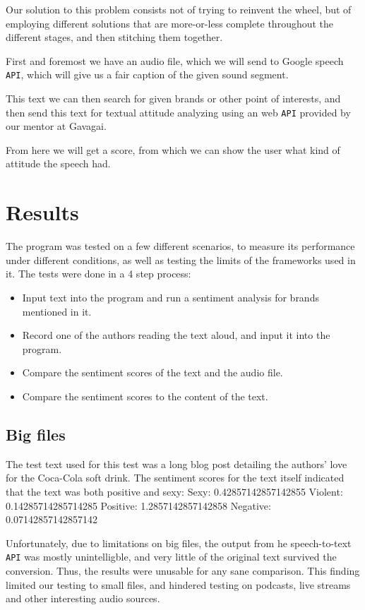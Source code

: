 \documentclass[a4paper,12pt,twoside]{ltxdoc}
\begin{document}
Our solution to this problem consists not of trying to reinvent the wheel, but of employing different
solutions that are more-or-less complete throughout the different stages, and then stitching them together.

First and foremost we have an audio file, which we will send to Google speech \verb#API#, which will give us a fair caption of the given sound segment.

This text we can then search for given brands or other point of interests, and then send this text for textual attitude analyzing using an web \verb#API# provided by our mentor at Gavagai.

From here we will get a score, from which we can show the user what kind of attitude the speech had. 

\section{Results}
The program was tested on a few different scenarios, to measure its performance under different conditions, as well as testing the limits of the frameworks used in it. The tests were done in a 4 step process:

\begin{itemize}
\item Input text into the program and run a sentiment analysis for brands mentioned in it.
\item Record one of the authors reading the text aloud, and input it into the program.
\item Compare the sentiment scores of the text and the audio file.
\item Compare the sentiment scores to the content of the text.
\end{itemize}

\subsection{Big files}
The test text used for this test was a long blog post detailing the authors' love for the Coca-Cola soft drink. The sentiment scores for the text itself indicated that the text was both positive and sexy:
Sexy: 0.42857142857142855 Violent: 0.14285714285714285 Positive: 1.2857142857142858 Negative: 0.07142857142857142


Unfortunately, due to limitations on big files, the output from he speech-to-text \verb#API# was mostly unintelligble, and very little of the original text survived the conversion. Thus, the results were unusable for any sane comparison. This finding limited our testing to small files, and hindered testing on podcasts, live streams and other interesting audio sources.
\end{document}
